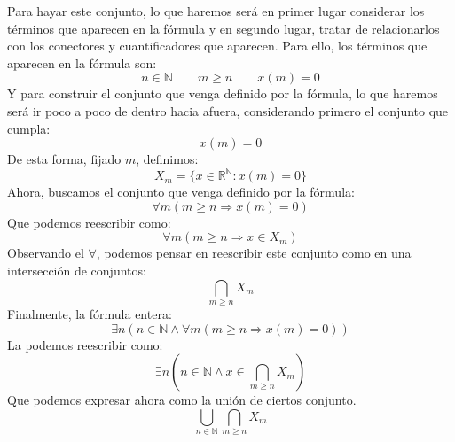 \begin{ejemplo}
\begin{itemize}
            Para hayar este conjunto, lo que haremos será en primer lugar considerar los términos que aparecen en la fórmula y en segundo lugar, tratar de relacionarlos con los conectores y cuantificadores que aparecen. Para ello, los términos que aparecen en la fórmula son:
            \begin{equation*}
                n\in \mathbb{N} \qquad m\geq n \qquad x(m) = 0
            \end{equation*}
            Y para construir el conjunto que venga definido por la fórmula, lo que haremos será ir poco a poco de dentro hacia afuera, considerando primero el conjunto que cumpla:
            \begin{equation*}
                x(m) = 0
            \end{equation*}
            De esta forma, fijado $m$, definimos:
            \begin{equation*}
                X_m = \{x\in \mathbb{R}^\mathbb{N} : x(m) = 0\}
            \end{equation*}
            Ahora, buscamos el conjunto que venga definido por la fórmula:
            \begin{equation*}
                \forall m(m\geq n\Longrightarrow x(m) = 0)
            \end{equation*}
            Que podemos reescribir como:
            \begin{equation*}
                \forall m(m\geq n\Longrightarrow x\in X_m)
            \end{equation*}
            Observando el $\forall $, podemos pensar en reescribir este conjunto como en una intersección de conjuntos:
            \begin{equation*}
                \bigcap_{m\geq n}X_m
            \end{equation*}
            Finalmente, la fórmula entera:
            \begin{equation*}
                \exists n(n\in \mathbb{N} \land \forall m(m\geq n \Longrightarrow x(m) = 0))
            \end{equation*}
            La podemos reescribir como:
            \begin{equation*}
                \exists n\left(n\in \mathbb{N} \land x\in \bigcap_{m\geq n} X_m\right)
            \end{equation*}
            Que podemos expresar ahora como la unión de ciertos conjunto.
            \begin{equation*}
                \bigcup_{n\in \mathbb{N}}\bigcap_{m\geq n} X_m

\end{equation*}
\end{itemize}
\end{ejemplo}
